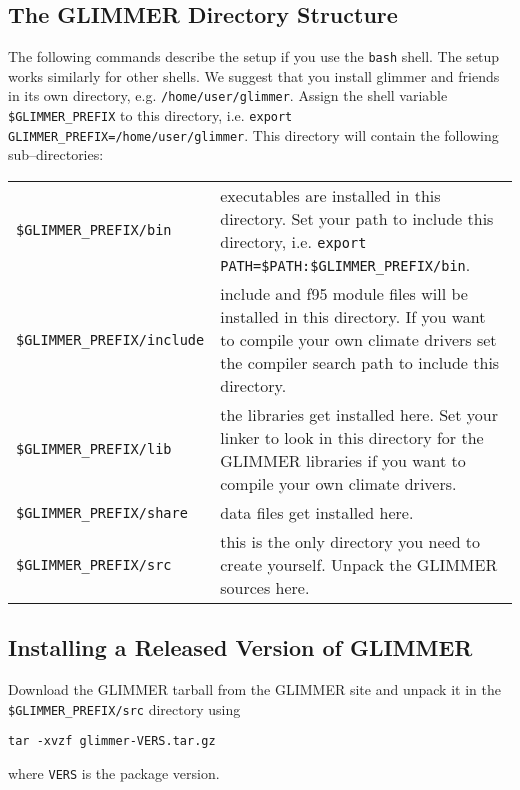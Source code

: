 \subsection{The GLIMMER Directory Structure}
The following commands describe the setup if you use the \texttt{bash} shell. The setup works similarly for other shells. We suggest that you install glimmer and friends in its own directory, e.g. \texttt{/home/user/glimmer}. Assign the shell variable \texttt{\$GLIMMER\_PREFIX} to this directory, i.e. \texttt{export GLIMMER\_PREFIX=/home/user/glimmer}. This directory will contain the following sub--directories:
\begin{center}
 \begin{tabular}{lp{9.5cm}}
   \texttt{\$GLIMMER\_PREFIX/bin} & executables are installed in this directory. Set your path to include this directory, i.e. \texttt{export PATH=\$PATH:\$GLIMMER\_PREFIX/bin}.  \\
   \texttt{\$GLIMMER\_PREFIX/include} & include and f95 module files will be installed in this directory. If you want to compile your own climate drivers set the compiler search path to include this directory. \\
   \texttt{\$GLIMMER\_PREFIX/lib} & the libraries get installed here. Set your linker to look in this directory for the GLIMMER libraries if you want to compile your own climate drivers. \\
   \texttt{\$GLIMMER\_PREFIX/share} & data files get installed here. \\
   \texttt{\$GLIMMER\_PREFIX/src} & this is the only directory you need to create yourself. Unpack the GLIMMER sources here.
 \end{tabular}
\end{center}
%
\subsection{Installing a Released Version of GLIMMER}\label{ug.sec.tarball}
Download the GLIMMER tarball from the GLIMMER site and unpack it in the \texttt{\$GLIMMER\_PREFIX/src} directory using
\begin{verbatim}
tar -xvzf glimmer-VERS.tar.gz
\end{verbatim}
where \texttt{VERS} is the package version.


